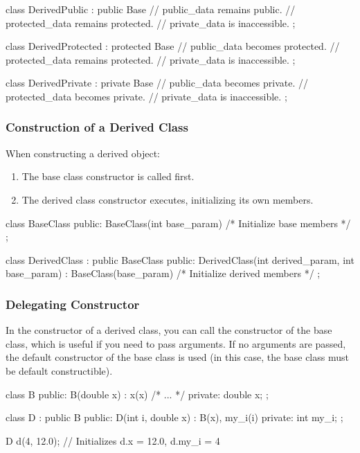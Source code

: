 \begin{codeblock}[language=C++]
class DerivedPublic : public Base { 
    // public_data remains public.
    // protected_data remains protected.
    // private_data is inaccessible.
};

class DerivedProtected : protected Base { 
    // public_data becomes protected.
    // protected_data remains protected.
    // private_data is inaccessible.
};

class DerivedPrivate : private Base { 
    // public_data becomes private.
    // protected_data becomes private.
    // private_data is inaccessible.
};
\end{codeblock}

\subsubsection{Construction of a Derived Class}

When constructing a derived object:

\begin{enumerate}
    \item The base class constructor is called first.
    \item The derived class constructor executes, initializing its own members.
\end{enumerate}

\begin{codeblock}[language=C++, numbers=none]
class BaseClass {
public:
    BaseClass(int base_param) { /* Initialize base members */ }
};

class DerivedClass : public BaseClass {
public:
    DerivedClass(int derived_param, int base_param) 
        : BaseClass(base_param) { /* Initialize derived members */ }
};
\end{codeblock}

\subsubsection{Delegating Constructor}

In the constructor of a derived class, you can call the constructor of the base class, which is useful if you need to pass arguments. If no arguments are passed, the default constructor of the base class is used (in this case, the base class must be default constructible).

\begin{codeblock}[language=C++]
class B {
public:
    B(double x) : x(x) { /* ... */ }
private:
    double x;
};

class D : public B {
public:
    D(int i, double x) : B(x), my_i(i) { }
private:
    int my_i;
};

D d(4, 12.0); // Initializes d.x = 12.0, d.my_i = 4
\end{codeblock}

